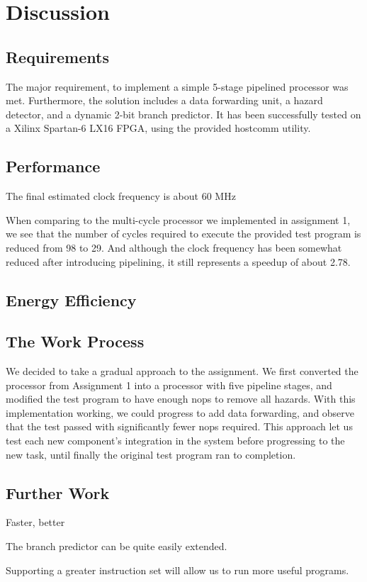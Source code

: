 \chapter{Discussion}

\section{Requirements}
The major requirement, to implement a simple 5-stage pipelined processor was met.
Furthermore, the solution includes a data forwarding unit, a hazard detector, and a dynamic 2-bit branch predictor.
It has been successfully tested on a Xilinx Spartan-6 LX16 FPGA, using the provided hostcomm\cite{hostcomm} utility.

\section{Performance}

The final estimated clock frequency is about 60 MHz 

When comparing to the multi-cycle processor we implemented in assignment 1, we see that the number of cycles required to execute the provided test program is reduced from 98 to 29.
And although the clock frequency has been somewhat reduced after introducing pipelining, it still represents a speedup of about 2.78.

\section{Energy Efficiency}

\section{The Work Process}
We decided to take a gradual approach to the assignment.
We first converted the processor from Assignment 1 into a processor with five pipeline stages, and modified the test program to have enough nops to remove all hazards.
With this implementation working, we could progress to add data forwarding, and observe that the test passed with significantly fewer nops required.
This approach let us test each new component's integration in the system before progressing to the new task, until finally the original test program ran to completion.

\section{Further Work}
Faster, better

The branch predictor can be quite easily extended.

Supporting a greater instruction set will allow us to run more useful programs.

